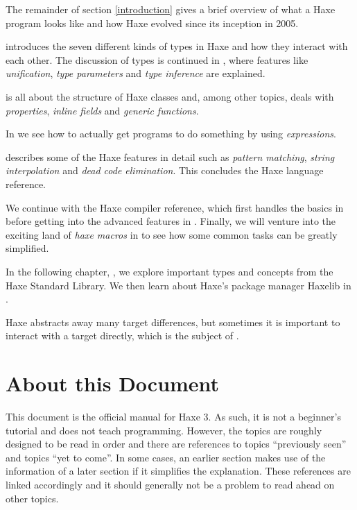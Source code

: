 The remainder of section \ref{introduction} gives a brief overview of what a Haxe program looks like and how Haxe evolved since its inception in 2005.

 introduces the seven different kinds of types in Haxe and how they interact with each other. The discussion of types is continued in , where features like \emph{unification}, \emph{type parameters} and \emph{type inference} are explained.

 is all about the structure of Haxe classes and, among other topics, deals with \emph{properties}, \emph{inline fields} and \emph{generic functions}.

In  we see how to actually get programs to do something by using \emph{expressions}.

 describes some of the Haxe features in detail such as \emph{pattern matching}, \emph{string interpolation} and \emph{dead code elimination}. This concludes the Haxe language reference.

We continue with the Haxe compiler reference, which first handles the basics in  before getting into the advanced features in . Finally, we will venture into the exciting land of \emph{haxe macros} in  to see how some common tasks can be greatly simplified.

In the following chapter, , we explore important types and concepts from the Haxe Standard Library. We then learn about Haxe's package manager Haxelib in .

Haxe abstracts away many target differences, but sometimes it is important to interact with a target directly, which is the subject of .

\section{About this Document}
\label{introduction-about-this-document}

This document is the official manual for Haxe 3. As such, it is not a beginner's tutorial and does not teach programming. However, the topics are roughly designed to be read in order and there are references to topics ``previously seen'' and topics ``yet to come''. In some cases, an earlier section makes use of the information of a later section if it simplifies the explanation. These references are linked accordingly and it should generally not be a problem to read ahead on other topics.

